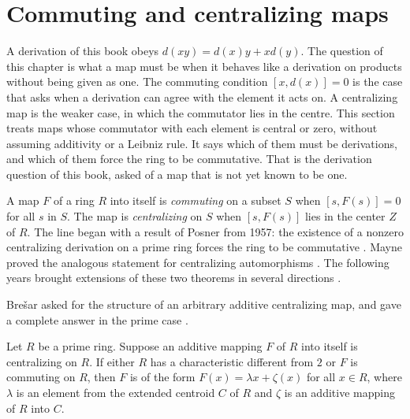 \section{Commuting and centralizing maps}\label{sec:functional-identities:commuting-maps}

A derivation of this book obeys $d(xy)=d(x)y+xd(y)$. The question of
this chapter is what a map must be when it behaves like a derivation on
products without being given as one. The commuting condition $[x,d(x)]=0$ is
the case that asks when a derivation can agree with the element it acts on.
A centralizing map is the weaker case, in which the commutator lies in the
centre.
This section treats maps whose commutator with each element is central or
zero, without assuming additivity or a Leibniz rule. It says which of them
must be derivations, and which of them force the ring to be commutative. That
is the derivation question of this book, asked of a map that is not yet known
to be one.

A map $F$ of a ring $R$ into itself is \emph{commuting} on a subset $S$
\cite[p.~333]{LeeTK1997Centralizing} when $[s,F(s)]=0$ for all $s$ in $S$.
The map is \emph{centralizing} on $S$
\cite[p.~333]{LeeTK1997Centralizing} when $[s,F(s)]$ lies in the center
$Z$ of $R$.
The line began with a result of Posner from 1957: the existence of a
nonzero centralizing derivation on a prime ring forces the ring to be
commutative \cite[p.~385]{Bresar1993}. Mayne proved the
analogous statement for centralizing automorphisms
\cite[p.~385]{Bresar1993}. The
following years brought extensions of these two theorems in several
directions \cite[p.~385]{Bresar1993}.

Bre\v{s}ar asked for the structure of an arbitrary additive centralizing
map, and gave a complete answer in the prime case
\cite[p.~385]{Bresar1993}.

\begin{theorem}\label{thm:fi:bresarA}
Let $R$ be a prime ring. Suppose an additive mapping $F$ of $R$ into
itself is centralizing on $R$. If either $R$ has a characteristic
different from $2$ or $F$ is commuting on $R$, then $F$ is of the form
$F(x)=\lambda x+\zeta(x)$ for all $x\in R$, where $\lambda$ is an element
from the extended centroid $C$ of $R$ and $\zeta$ is an additive mapping
of $R$ into $C$.
\end{theorem}

